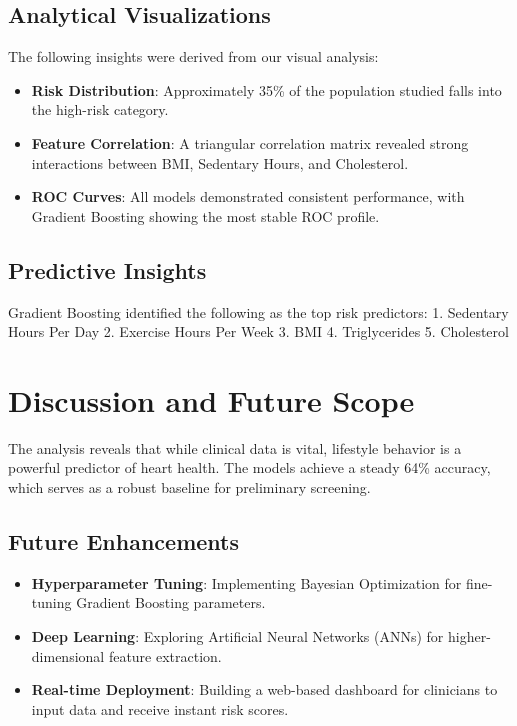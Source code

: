 \documentclass[12pt]{article}
\begin{document}
\subsection{Analytical Visualizations}
The following insights were derived from our visual analysis:
\begin{itemize}
    \item \textbf{Risk Distribution}: Approximately 35\% of the population studied falls into the high-risk category.
    \item \textbf{Feature Correlation}: A triangular correlation matrix revealed strong interactions between BMI, Sedentary Hours, and Cholesterol.
    \item \textbf{ROC Curves}: All models demonstrated consistent performance, with Gradient Boosting showing the most stable ROC profile.
\end{itemize}

\subsection{Predictive Insights}
Gradient Boosting identified the following as the top risk predictors:
1. Sedentary Hours Per Day
2. Exercise Hours Per Week
3. BMI
4. Triglycerides
5. Cholesterol

\section{Discussion and Future Scope}
The analysis reveals that while clinical data is vital, lifestyle behavior is a powerful predictor of heart health. The models achieve a steady 64\% accuracy, which serves as a robust baseline for preliminary screening.

\subsection{Future Enhancements}
\begin{itemize}
    \item \textbf{Hyperparameter Tuning}: Implementing Bayesian Optimization for fine-tuning Gradient Boosting parameters.
    \item \textbf{Deep Learning}: Exploring Artificial Neural Networks (ANNs) for higher-dimensional feature extraction.
    \item \textbf{Real-time Deployment}: Building a web-based dashboard for clinicians to input data and receive instant risk scores.
\end{itemize}
\end{document}
